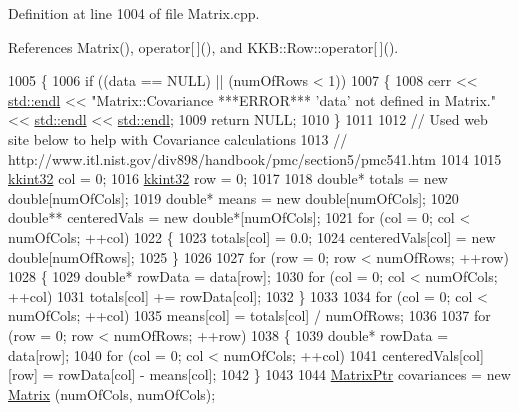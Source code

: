 Definition at line 1004 of file Matrix.\+cpp.



References Matrix(), operator\mbox{[}$\,$\mbox{]}(), and K\+K\+B\+::\+Row\+::operator\mbox{[}$\,$\mbox{]}().


\begin{DoxyCode}
1005 \{
1006   \textcolor{keywordflow}{if}  ((data == NULL)  ||  (numOfRows < 1))
1007   \{
1008     cerr << \hyperlink{namespace_k_k_b_ad1f50f65af6adc8fa9e6f62d007818a8}{std::endl} << \textcolor{stringliteral}{"Matrix::Covariance   ***ERROR***   'data' not defined in Matrix."} << 
      \hyperlink{namespace_k_k_b_ad1f50f65af6adc8fa9e6f62d007818a8}{std::endl} << \hyperlink{namespace_k_k_b_ad1f50f65af6adc8fa9e6f62d007818a8}{std::endl};
1009     \textcolor{keywordflow}{return} NULL;
1010   \}
1011 
1012   \textcolor{comment}{// Used web site below to help with Covariance calculations}
1013   \textcolor{comment}{//  http://www.itl.nist.gov/div898/handbook/pmc/section5/pmc541.htm}
1014 
1015   \hyperlink{namespace_k_k_b_a8fa4952cc84fda1de4bec1fbdd8d5b1b}{kkint32}  col = 0;
1016   \hyperlink{namespace_k_k_b_a8fa4952cc84fda1de4bec1fbdd8d5b1b}{kkint32}  row = 0;
1017 
1018   \textcolor{keywordtype}{double}*   totals       = \textcolor{keyword}{new} \textcolor{keywordtype}{double}[numOfCols];
1019   \textcolor{keywordtype}{double}*   means        = \textcolor{keyword}{new} \textcolor{keywordtype}{double}[numOfCols];
1020   \textcolor{keywordtype}{double}**  centeredVals = \textcolor{keyword}{new} \textcolor{keywordtype}{double}*[numOfCols];
1021   \textcolor{keywordflow}{for}  (col = 0;  col < numOfCols;  ++col)
1022   \{
1023     totals[col] = 0.0;
1024     centeredVals[col] = \textcolor{keyword}{new} \textcolor{keywordtype}{double}[numOfRows];
1025   \}
1026 
1027   \textcolor{keywordflow}{for}  (row = 0;  row < numOfRows;  ++row)
1028   \{
1029     \textcolor{keywordtype}{double}*  rowData = data[row];
1030     \textcolor{keywordflow}{for}  (col = 0;  col < numOfCols;  ++col)
1031       totals[col] += rowData[col];
1032   \}
1033 
1034   \textcolor{keywordflow}{for}  (col = 0;  col < numOfCols;  ++col)
1035     means[col] = totals[col] / numOfRows;
1036 
1037   \textcolor{keywordflow}{for}  (row = 0;  row < numOfRows;  ++row)
1038   \{
1039     \textcolor{keywordtype}{double}*  rowData = data[row];
1040     \textcolor{keywordflow}{for}  (col = 0;  col < numOfCols;  ++col)
1041       centeredVals[col][row] = rowData[col] - means[col];
1042   \}
1043  
1044   \hyperlink{class_k_k_b_1_1_matrix}{MatrixPtr}  covariances = \textcolor{keyword}{new} \hyperlink{class_k_k_b_1_1_matrix_a2dba13c45127354c9f75ef576f49269b}{Matrix} (numOfCols, numOfCols);

\end{DoxyCode}
